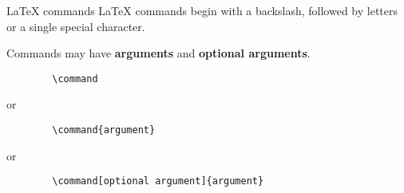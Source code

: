 \copyrightTim

\begin{frame}[fragile]{LaTeX commands}
    LaTeX commands begin with a backslash, followed by letters or a single special character.

    Commands may have \textbf{arguments} and \textbf{optional arguments}.

    \begin{verbatim}
        \command
    \end{verbatim}
    or
    \begin{verbatim}
        \command{argument}
    \end{verbatim}
    or
    \begin{verbatim}
        \command[optional argument]{argument}
    \end{verbatim}

\end{frame}